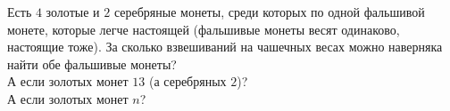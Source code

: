 \begin{problems}
\item
\sbp
Есть $4$ золотые и $2$ серебряные монеты, среди которых по одной фальшивой
монете, которые легче настоящей
(фальшивые монеты весят одинаково, настоящие тоже).
За сколько взвешиваний  на чашечных весах можно наверняка найти обе фальшивые
монеты?
\\
\sbp
А если золотых монет $13$ (а серебряных $2$)?
\\
\sbp
А если золотых монет $n$?

\end{problems}

